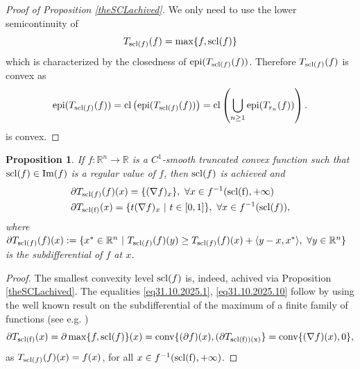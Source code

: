 \documentclass[12pt,twoside,reqno]{amsart}
\newtheorem{proposition}{Proposition}[section]
\theoremstyle{definition}
\newtheorem{example}{Example}[section]
\numberwithin{equation}{section}
\begin{document}
\begin{proof}[Proof of Proposition \ref{theSCLachived}]
We only need to use the lower semicontinuity of \[T_{{\rm scl}(f)}(f)=\max\{f,{\rm scl}(f)\}\] which is characterized by 
the closedness of ${\rm epi}(T_{{\rm scl}(f)}(f))$. Therefore $T_{{\rm scl}(f)}(f)$ is convex as
\[
{\rm epi}(T_{{\rm scl}(f)}(f))={\rm cl}\left({\rm epi}(T_{{\rm scl}(f)}(f))\right)={\rm cl}\left(\displaystyle\bigcup_{n\geq 1}{\rm epi}(T_{r_n}(f))\right). 
\]
is convex.
\end{proof}
\begin{proposition}\label{prop27.03.2021.1}
If $f:\mathbb{R}^n\longrightarrow\mathbb{R}$ is a $C^1$-smooth truncated convex function such that ${\rm scl}(f)\in {\rm Im}(f)$ is
a regular value of $f$, then ${\rm scl}(f)$ is achieved and 
\begin{align}
& \partial T_{{\rm scl}(f)}(f)(x)=\{(\nabla f)_x\}, \ \forall x\in f^{-1}({\rm scl(f)},+\infty)\label{eq31.10.2025.1}\\
& \partial T_{\rm scl(f)}(x)=\{t(\nabla f)_x \ | \ t\in[0,1]\}, \ \forall x\in f^{-1}({\rm scl}(f)),\label{eq31.10.2025.10}
\end{align}
where 
$\partial T_{{\rm scl}(f)}(f)(x):=\{x^*\in\mathbb{R}^n \ | \ T_{{\rm scl}(f)}(f)(y)\geq T_{{\rm scl}(f)}(f)(x)+\langle y-x,x^*\rangle, \ \forall y\in\mathbb{R}^n\}$
is the {\em subdifferential} of $f$ at $x$.
\end{proposition}
\begin{proof} 
The smallest convexity level ${\rm scl}(f)$ is, indeed, achived via Proposition \ref{theSCLachived}. The equalities \eqref{eq31.10.2025.1}, 
\eqref{eq31.10.2025.10} follow by using the well known 
result on the subdifferential of the maximum of a finite family of functions (see e.g. \cite[Corollary 4.3.2, p. 266]{Uruty-Lemarechal-1})
\[\partial T_{\rm scl(f)}(x)=\partial \max\{f,{\rm scl}(f)\}(x)={\rm conv}\{(\partial f)(x),(\partial T_{\rm scl(f))(x)}\}={\rm conv}\{(\nabla f)(x),0\},\]
as $T_{{\rm scl}(f)}(f)(x)=f(x)$,  for all $x\in f^{-1}({\rm scl(f)},+\infty)$.
\end{proof}
\end{document}
